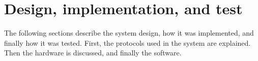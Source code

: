 \chapter{Design, implementation, and test}
\label{sec:implementation}

The following sections describe the system design, how it was implemented, and finally how it was tested. First, the protocols used in the system are explained. Then the hardware is discussed, and finally the software.













